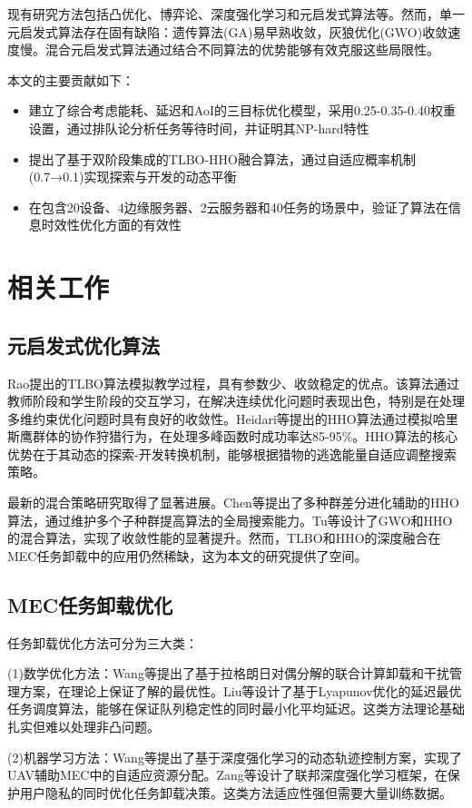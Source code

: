 \documentclass[conference]{IEEEtran}
\begin{document}
现有研究方法包括凸优化\cite{b2}、博弈论、深度强化学习\cite{b3}和元启发式算法等。然而，单一元启发式算法存在固有缺陷：遗传算法(GA)易早熟收敛，灰狼优化(GWO)收敛速度慢\cite{b4}。混合元启发式算法通过结合不同算法的优势能够有效克服这些局限性。

本文的主要贡献如下：
\begin{itemize}
    \item 建立了综合考虑能耗、延迟和AoI的三目标优化模型，采用0.25-0.35-0.40权重设置，通过排队论分析任务等待时间，并证明其NP-hard特性
    \item 提出了基于双阶段集成的TLBO-HHO融合算法，通过自适应概率机制(0.7→0.1)实现探索与开发的动态平衡
    \item 在包含20设备、4边缘服务器、2云服务器和40任务的场景中，验证了算法在信息时效性优化方面的有效性
\end{itemize}

\section{相关工作}
\subsection{元启发式优化算法}
Rao\cite{b5}提出的TLBO算法模拟教学过程，具有参数少、收敛稳定的优点。该算法通过教师阶段和学生阶段的交互学习，在解决连续优化问题时表现出色，特别是在处理多维约束优化问题时具有良好的收敛性。Heidari等\cite{b6}提出的HHO算法通过模拟哈里斯鹰群体的协作狩猎行为，在处理多峰函数时成功率达85-95\%。HHO算法的核心优势在于其动态的探索-开发转换机制，能够根据猎物的逃逸能量自适应调整搜索策略。

最新的混合策略研究取得了显著进展。Chen等\cite{b7}提出了多种群差分进化辅助的HHO算法，通过维护多个子种群提高算法的全局搜索能力。Tu等\cite{b8}设计了GWO和HHO的混合算法，实现了收敛性能的显著提升。然而，TLBO和HHO的深度融合在MEC任务卸载中的应用仍然稀缺，这为本文的研究提供了空间。

\subsection{MEC任务卸载优化}
任务卸载优化方法可分为三大类：

(1)数学优化方法：Wang等\cite{b9}提出了基于拉格朗日对偶分解的联合计算卸载和干扰管理方案，在理论上保证了解的最优性。Liu等\cite{b10}设计了基于Lyapunov优化的延迟最优任务调度算法，能够在保证队列稳定性的同时最小化平均延迟。这类方法理论基础扎实但难以处理非凸问题。

(2)机器学习方法：Wang等\cite{b11}提出了基于深度强化学习的动态轨迹控制方案，实现了UAV辅助MEC中的自适应资源分配。Zang等\cite{b13}设计了联邦深度强化学习框架，在保护用户隐私的同时优化任务卸载决策。这类方法适应性强但需要大量训练数据。
\end{document}
